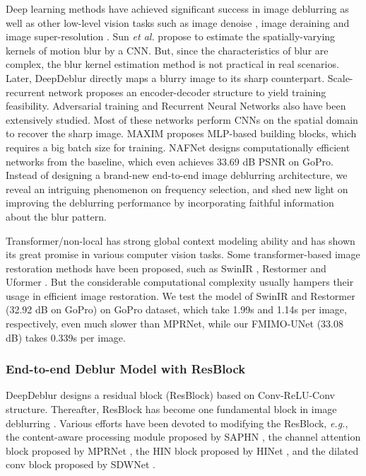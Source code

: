 \documentclass[letterpaper]{article} \usepackage{aaai23}  \usepackage{times}  \usepackage{helvet}  \usepackage{courier}  \usepackage[hyphens]{url}  \usepackage{graphicx} \usepackage{enumitem}
\begin{document}
Deep learning methods have achieved significant success in image deblurring \cite{Sun2015learning,Nah2017deep} as well as other low-level vision tasks such as image denoise \cite{Cheng2021nbnet,Zamir2020learning}, image deraining \cite{Jiang2020multi} and image super-resolution \cite{Mei2021image,Dong2016image,Zhang2018residual,Guo2020closed}. Sun \textit{et al.} \cite{Sun2015learning} propose to estimate the spatially-varying kernels of motion blur by a CNN. But, since the characteristics of blur are complex, the blur kernel estimation method is not practical in real scenarios. Later, DeepDeblur \cite{Nah2017deep} directly maps a blurry image to its sharp counterpart. Scale-recurrent network \cite{Tao2018scale} proposes an encoder-decoder structure to yield training feasibility. Adversarial training\cite{Kupyn2018deblurgan,Kupyn2019deblurgan,Zhang2020deblurring} and Recurrent Neural Networks\cite{Zhang2018dynamic,Park2020multi} also have been extensively studied. Most of these networks perform CNNs on the spatial domain to recover the sharp image.  
MAXIM \cite{Tu2022maxim} proposes MLP-based building blocks, which requires a big batch size for training. NAFNet \cite{Chen2022simple} designs computationally efficient networks from the baseline, which even achieves 33.69 dB PSNR on GoPro. Instead of designing a brand-new end-to-end image deblurring architecture, we reveal an intriguing phenomenon on frequency selection, and shed new light on improving the deblurring performance by incorporating faithful information about the blur pattern. 

Transformer/non-local has strong global context modeling ability and has shown its great promise in various computer vision tasks. Some transformer-based image restoration methods have been proposed, such as SwinIR \cite{Liang2021swinir}, Restormer \cite{Zamir2021restormer} and Uformer \cite{Wang2022uformer}. But the considerable computational complexity usually hampers their usage in efficient image restoration. We test the model of SwinIR \cite{Liang2021swinir} and Restormer (32.92 dB on GoPro) \cite{Zamir2021restormer} on GoPro dataset, which take 1.99s and 1.14s per image, respectively, even much slower than MPRNet, while our FMIMO-UNet (33.08 dB) takes 0.339s per image.

\subsubsection{End-to-end Deblur Model with ResBlock}

DeepDeblur \cite{Nah2017deep} designs a residual block (ResBlock) based on Conv-ReLU-Conv structure. Thereafter, ResBlock has become one fundamental block in image deblurring \cite{Tao2018scale,Zhang2019deep,Park2020multi,Cho2021rethinking}. Various efforts have been devoted to modifying the ResBlock, \textit{e.g.}, the content-aware processing module proposed by SAPHN \cite{Suin2020spatially}, the channel attention block proposed by MPRNet \cite{Zamir2021multi}, the HIN block proposed by HINet \cite{Chen2021hinet}, and the dilated conv block proposed by SDWNet \cite{Zou2021sdwnet}.
\end{document}

